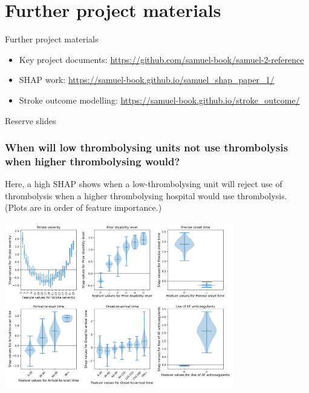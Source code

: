 \documentclass[xcolor={usenames,dvipsnames}]{beamer}
\begin{document}

\section{Further project materials}

\begin{frame}{Further project materials}

\begin{itemize}
    \setlength\itemsep{4mm}
    \item Key project documents: \url{https://github.com/samuel-book/samuel-2-reference}
    \item SHAP work: \url{https://samuel-book.github.io/samuel_shap_paper_1/}
    \item Stroke outcome modelling: \url{https://samuel-book.github.io/stroke_outcome/}
    
\end{itemize}
    
\end{frame}



\begin{frame}{}
\end{frame}

\begin{frame}{Reserve slides}
\end{frame}


\begin{frame}
\frametitle{When will low thrombolysing units not use thrombolysis when higher thrombolysing would?}

\footnotesize{Here, a high SHAP shows when a low-thrombolysing unit will reject use of thrombolysis when a higher thrombolysing hospital would use thrombolysis. (Plots are in order of feature importance.)}

\begin{center}
\includegraphics[width=0.75\textwidth]{./images/xgb_predicting_difference_shap_violin.jpg}
\end{center}
\end{frame}
\end{document}
